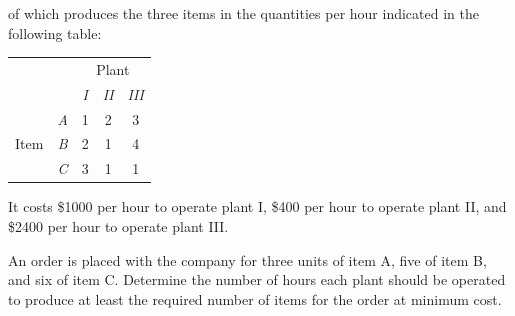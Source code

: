 \documentclass[a4paper,leqno]{article}
\numberwithin{equation}{section}
\theoremstyle{definition}
\theoremstyle{remark}
\begin{document}
\begin{enumerate}
        of which produces the three items in the quantities per hour indicated in the following table:
        \begin{center}
          \renewcommand{\arraystretch}{1.5}
          \begin{tabular}{  c | c | c | c | c | }
            \multicolumn{1}{r}{} & \multicolumn{1}{r}{} & \multicolumn{3}{c}{Plant} \\ \cline{3-5}
            \multicolumn{1}{r}{} & & \textit{I} & \textit{II} & \textit{III} \\ \cline{2-5}
            \multirow{3}{*}{Item} & \textit{A} & 1 & 2 & 3 \\ \cline{2-5}
            & \textit{B} & 2 & 1 & 4 \\ \cline{2-5}
            & \textit{C} & 3 & 1 & 1 \\ \cline{2-5}
          \end{tabular}
        \end{center}
        It costs \$1000 per hour to operate plant I, \$400 per hour
        to operate plant II, and \$2400 per hour to operate plant III.

        An order is placed with the company for three units of item A, five of item B,
        and six of item C. Determine the number of hours each plant should be operated
        to produce at least the required number of items for the order at minimum cost.
\end{enumerate}
\end{document}
